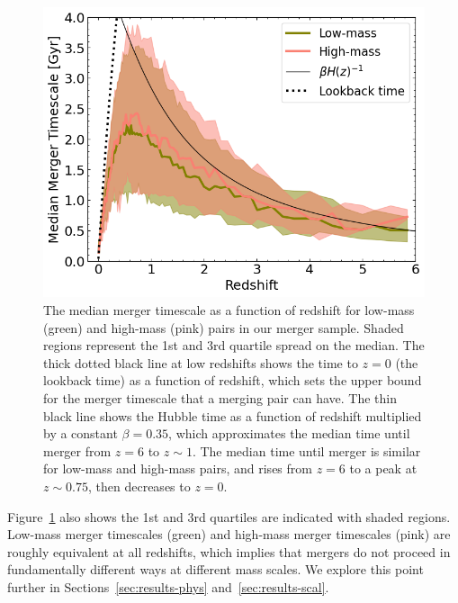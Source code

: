 \documentclass[twocolumn,linenumbers]{aastex631}
\begin{document}
        
        \begin{figure}[tb]
            \centering
            \includegraphics[width=\columnwidth]{plots/bet-on-it/8_timescale.png}
            \caption{The median merger timescale as a function of redshift for low-mass (green) and high-mass (pink) pairs in our merger sample. 
            Shaded regions represent the 1st and 3rd quartile spread on the median. 
            The thick dotted black line at low redshifts shows the time to $z=0$ (the lookback time) as a function of redshift, which sets the upper bound for the merger timescale that a merging pair can have. 
            The thin black line shows the Hubble time as a function of redshift multiplied by a constant $\beta=0.35$, which approximates the median time until merger from $z=6$ to $z\sim1$.
            The median time until merger is similar for low-mass and high-mass pairs, and rises from $z=6$ to a peak at $z\sim0.75$, then decreases to $z=0$.}
            \label{fig:timescales}
        \end{figure}
    

        Figure~\ref{fig:timescales} also shows
        the 1st and 3rd quartiles are indicated with shaded regions. 
        Low-mass merger timescales (green) and high-mass merger timescales (pink) are roughly equivalent at all redshifts, which implies that mergers do not proceed in fundamentally different ways at different mass scales. 
        We explore this point further in Sections~\ref{sec:results-phys} and~\ref{sec:results-scal}.
        
\end{document}
